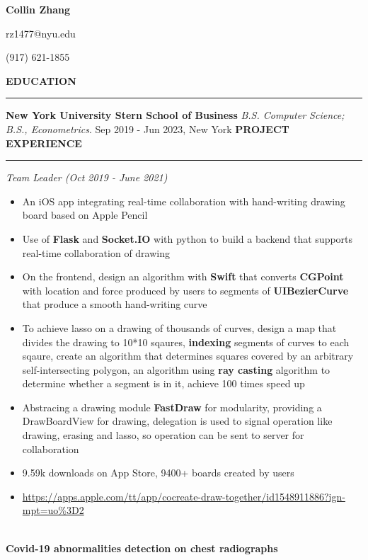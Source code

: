 \documentclass{article}
\begin{document}
\begin{center}
{\huge \textbf{Collin Zhang}}\par
rz1477@nyu.edu\par(917) 621-1855
\end{center}

\noindent
{\textbf{EDUCATION}}\newline
\rule{\textwidth}{1pt}
{\textbf {New York University Stern School of Business}}\newline
\emph {B.S. Computer Science; B.S., Econometrics}.\newline
{Sep 2019 - Jun 2023, New York}\newline
\newline
\noindent
{\textbf{PROJECT EXPERIENCE}}\newline
\rule{\textwidth}{1pt}\newline
\emph{Team Leader (Oct 2019 - June 2021)}
\begin{itemize}[leftmargin=*,topsep=0pt]
\item An iOS app integrating real-time collaboration with hand-writing drawing board based on Apple Pencil
\item Use of \textbf{Flask} and \textbf{Socket.IO} with python to build a backend that supports real-time collaboration of drawing
\item On the frontend, design an algorithm with \textbf{Swift} that converts \textbf{CGPoint} with location and force produced by users to segments of \textbf{UIBezierCurve} that produce a smooth hand-writing curve
\item To achieve lasso on a drawing of thousands of curves, design a map that divides the drawing to 10*10 sqaures, \textbf{indexing} segments of curves to each sqaure, create an algorithm that determines squares covered by an arbitrary self-intersecting polygon, an algorithm using \textbf{ray casting} algorithm to determine whether a segment is in it, achieve 100 times speed up
\item Abstracing a drawing module \textbf{FastDraw} for modularity, providing a DrawBoardView for drawing, delegation is used to signal operation like drawing, erasing and lasso, so operation can be sent to server for collaboration
\item 9.59k downloads on App Store, 9400+ boards created by users
\item \url{https://apps.apple.com/tt/app/cocreate-draw-together/id1548911886?ign-mpt=uo%3D2}

\end{itemize} \ \\ {\textbf{Covid-19 abnormalities detection on chest radiographs}}\newline
\end{document}
